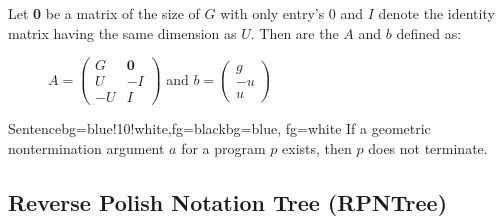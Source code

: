 \begin{frame}
	\begin{definition}[\iterationmatrix, \iterationconstants]
		Let \textbf{0} be a matrix of the size of $G$ with only entry's 0 and $I$ denote the identity matrix having the same dimension as $U$. Then are the \iterationmatrix $A$ and \iterationconstants $b$ defined as:
		\begin{figure}[H]
			\centering
			$A = \begin{pmatrix} G & \textbf{0} \\ U & -I \\ -U & I \end{pmatrix}$ and $b = \begin{pmatrix} g \\ -u \\ u \end{pmatrix}$
		\end{figure}
	\end{definition}
	\begin{variableblock}{Sentence}{bg=blue!10!white,fg=black}{bg=blue, fg=white}
		If a geometric nontermination argument $a$ for a program $p$ exists, then $p$ does
		not terminate.
	\end{variableblock}
\end{frame}

\subsection{Reverse Polish Notation Tree (RPNTree)}

